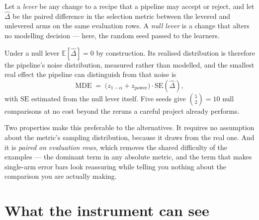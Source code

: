 \documentclass{article}
\begin{document}
Let a \emph{lever} be any change to a recipe that a pipeline may accept or reject, and let $\widehat\Delta$ be the paired difference in the selection metric between the levered and unlevered arms on the same evaluation rows. A \emph{null lever} is a change that alters no modelling decision --- here, the random seed passed to the learners.

Under a null lever $\mathbb{E}[\widehat\Delta]=0$ by construction. Its realised distribution is therefore the pipeline's noise distribution, measured rather than modelled, and the smallest real effect the pipeline can distinguish from that noise is
\begin{equation}
\mathrm{MDE} \;=\; \big(z_{1-\alpha} + z_{\mathrm{power}}\big)\cdot \mathrm{SE}(\widehat\Delta),
\end{equation}
with $\mathrm{SE}$ estimated from the null lever itself. Five seeds give $\binom{5}{2}=10$ null comparisons at no cost beyond the reruns a careful project already performs.

Two properties make this preferable to the alternatives. It requires no assumption about the metric's sampling distribution, because it draws from the real one. And it is \emph{paired on evaluation rows}, which removes the shared difficulty of the examples --- the dominant term in any absolute metric, and the term that makes single-arm error bars look reassuring while telling you nothing about the comparison you are actually making.

\section{What the instrument can see}
\end{document}
